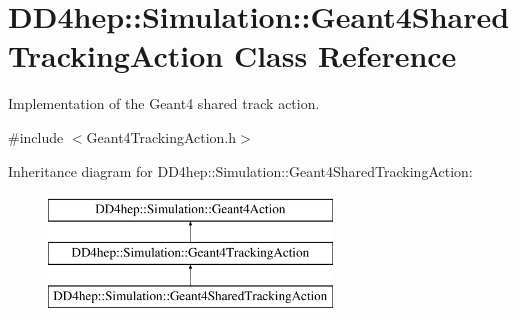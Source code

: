 \hypertarget{class_d_d4hep_1_1_simulation_1_1_geant4_shared_tracking_action}{}\section{D\+D4hep\+:\+:Simulation\+:\+:Geant4\+Shared\+Tracking\+Action Class Reference}
\label{class_d_d4hep_1_1_simulation_1_1_geant4_shared_tracking_action}


Implementation of the Geant4 shared track action.  




{\ttfamily \#include $<$Geant4\+Tracking\+Action.\+h$>$}

Inheritance diagram for D\+D4hep\+:\+:Simulation\+:\+:Geant4\+Shared\+Tracking\+Action\+:\begin{figure}[H]
\begin{center}
\leavevmode
\includegraphics[height=3.000000cm]{class_d_d4hep_1_1_simulation_1_1_geant4_shared_tracking_action}
\end{center}
\end{figure}
